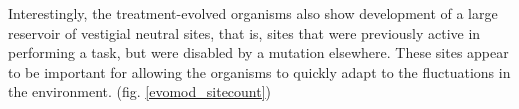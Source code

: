 Interestingly, the treatment-evolved organisms also show development of a large reservoir of vestigial neutral sites, that is, sites that were previously active in performing a task, but were disabled by a mutation elsewhere.  These sites appear to be important for allowing the organisms to quickly adapt to the fluctuations in the environment. (fig. \ref{evomod_sitecount})
